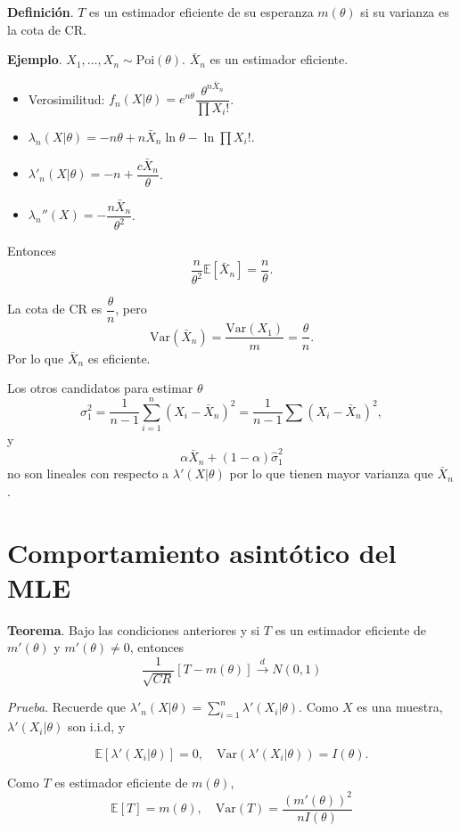 \documentclass[
  12pt,
]{book}
\begin{document}
\textbf{Definición}. \(T\) es un estimador eficiente de su esperanza \(m(\theta)\) si su varianza es la cota de CR.

\textbf{Ejemplo}. \(X_1,\dots, X_n\sim \text{Poi}(\theta)\). \(\bar X_n\) es un estimador eficiente.

\begin{itemize}
\item
  Verosimilitud: \(f_n(X|\theta) = e ^{n\theta}\dfrac{\theta^{n\bar X_n}}{\prod X_i!}\).
\item
  \(\lambda_n(X|\theta) = -n\theta + n\bar X_n \ln \theta - \ln \prod X_i!\).
\item
  \(\lambda'_n(X|\theta) = -n+\dfrac{c\bar X_n}{\theta}\).
\item
  \(\lambda_n''(X) = -\dfrac{n\bar X_n}{\theta^2}\).
\end{itemize}

Entonces
\[\dfrac{n}{\theta^2}\mathbb E[\bar X_n] = \dfrac n{\theta}.\]

La cota de CR es \(\dfrac \theta n\), pero
\[\text{Var}(\bar X_n) = \dfrac{\text{Var}(X_1)}{m} = \dfrac \theta n.\]
Por lo que \(\bar X_n\) es eficiente.

Los otros candidatos para estimar \(\theta\)
\[\sigma_1^2=\dfrac 1{n-1}\sum_{i=1}^{n}\left(X_{i}-\bar{X}_{n}\right)^{2} = \dfrac 1{n-1}\sum (X_i-\bar X_n)^2,\]
y
\[\alpha \bar X_n + (1-\alpha)\hat\sigma^2_1\]
no son lineales con respecto a \(\lambda'(X|\theta)\) por lo que tienen mayor varianza que \(\bar X_n\).

\hypertarget{comportamiento-asintuxf3tico-del-mle}{%
\section{Comportamiento asintótico del MLE}\label{comportamiento-asintuxf3tico-del-mle}}

\textbf{Teorema}. Bajo las condiciones anteriores y si \(T\) es un estimador eficiente de \(m'(\theta)\) y \(m'(\theta) \neq 0\), entonces
\[\dfrac 1{\sqrt{CR}}[T-m(\theta)]\xrightarrow{d}N(0,1)\]

\emph{Prueba}. Recuerde que \(\lambda'_n(X|\theta) = \sum_{i=1}^n\lambda'(X_i|\theta)\). Como \(X\) es una muestra, \(\lambda'(X_i|\theta)\) son i.i.d, y

\[\mathbb E[\lambda'(X_i|\theta)] = 0, \quad \text{Var}(\lambda'(X_i|\theta)) = I(\theta).\]

Como \(T\) es estimador eficiente de \(m(\theta)\),
\[\mathbb E[T] = m(\theta), \quad \text{Var}(T) = \dfrac{(m'(\theta))^2}{nI(\theta)}\]
\end{document}
